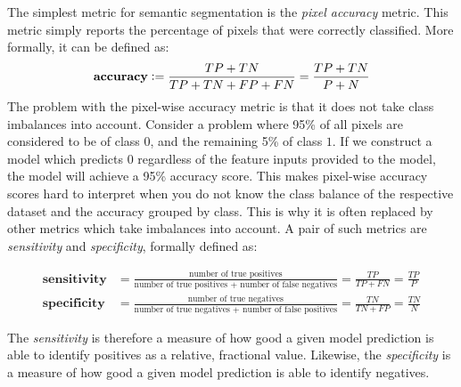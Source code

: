 The simplest metric for semantic segmentation is the \textit{pixel accuracy} metric.
This metric simply reports the percentage of pixels that were correctly classified.
More formally, it can be defined as:
%
\begin{equation*}
    \textbf{accuracy}
    \vcentcolon=
    \frac{TP + TN}{TP + TN + FP + FN} = \frac{TP + TN}{P + N}
\end{equation*}
%
The problem with the pixel-wise accuracy metric is that it does not take class imbalances into account.
Consider a problem where 95\% of all pixels are considered to be of class $0$, and the remaining 5\% of class $1$.
If we construct a model which predicts $0$ regardless of the feature inputs provided to the model, the model will achieve a 95\% accuracy score.
This makes pixel-wise accuracy scores hard to interpret when you do not know the class balance of the respective dataset and the accuracy grouped by class.
This is why it is often replaced by other metrics which take imbalances into account.
A pair of such metrics are \textit{sensitivity} and \textit{specificity}, formally defined as:
%
\begin{small}
\begin{align*}
    \textbf{sensitivity}
    &=
    \frac{\text{number of true positives}}{\text{number of true positives + number of false negatives}}
    =
    \frac{TP}{TP + FN}
    =
    \frac{TP}{P}
    \\
    \textbf{specificity}
    &=
    \frac{\text{number of true negatives}}{\text{number of true negatives + number of false positives}}
    =
    \frac{TN}{TN + FP}
    =
    \frac{TN}{N}
\end{align*}
\end{small}
%
The \textit{sensitivity} is therefore a measure of how good a given model prediction is able to identify positives as a relative, fractional value.
Likewise, the \textit{specificity} is a measure of how good a given model prediction is able to identify negatives.
